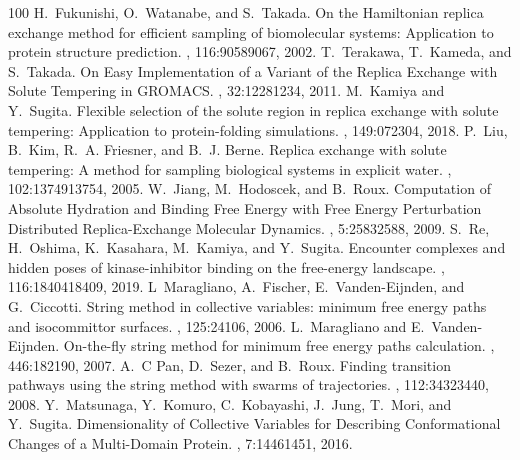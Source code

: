 \documentclass[a4paper,11pt,oneside,english]{sphinxmanual}
\begin{document}
\begin{sphinxthebibliography}{100}
H. Fukunishi, O. Watanabe, and S. Takada. On the Hamiltonian replica exchange method for efficient sampling of biomolecular systems: Application to protein structure prediction. , 116:9058\textendash{}9067, 2002.
T. Terakawa, T. Kameda, and S. Takada. On Easy Implementation of a Variant of the Replica Exchange with Solute Tempering in GROMACS. , 32:1228\textendash{}1234, 2011.
M. Kamiya and Y. Sugita. Flexible selection of the solute region in replica exchange with solute tempering: Application to protein-folding simulations. , 149:072304, 2018.
P. Liu, B. Kim, R. A. Friesner, and B. J. Berne. Replica exchange with solute tempering: A method for sampling biological systems in explicit water. , 102:13749\textendash{}13754, 2005.
W. Jiang, M. Hodoscek, and B. Roux. Computation of Absolute Hydration and Binding Free Energy with Free Energy Perturbation Distributed Replica-Exchange Molecular Dynamics. , 5:2583\textendash{}2588, 2009.
S. Re, H. Oshima, K. Kasahara, M. Kamiya, and Y. Sugita. Encounter complexes and hidden poses of kinase-inhibitor binding on the free-energy landscape. , 116:18404\textendash{}18409, 2019.
L Maragliano, A. Fischer, E. Vanden-Eijnden, and G. Ciccotti. String method in collective variables: minimum free energy paths and isocommittor surfaces. , 125:24106, 2006.
L. Maragliano and E. Vanden-Eijnden. On-the-fly string method for minimum free energy paths calculation. , 446:182\textendash{}190, 2007.
A. C Pan, D. Sezer, and B. Roux. Finding transition pathways using the string method with swarms of trajectories. , 112:3432\textendash{}3440, 2008.
Y. Matsunaga, Y. Komuro, C. Kobayashi, J. Jung, T. Mori, and Y. Sugita. Dimensionality of Collective Variables for Describing Conformational Changes of a Multi-Domain Protein. , 7:1446\textendash{}1451, 2016.

\end{sphinxthebibliography}
\end{document}
